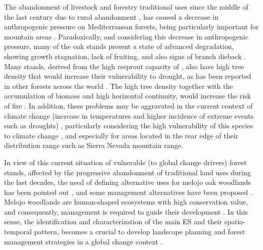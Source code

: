 The abandonment of livestock and forestry traditional uses since the middle of the last century due to rural abandonment \autocites{MacDonaldetal2000AgriculturalAbandonment}, has caused a decrease in anthropogenic pressure on Mediterranean forests, being particularly important for mountain areas \autocites{JimenezOlivenciaetal2015MedioSiglo,JimenezOlivenciaetal2015EvolucionUsos,Piasetal2014ColonizationAbandoned,ValbuenaCarabanaetal2010HistoricalRecent}. Paradoxically, and considering this decrease in anthropogenic pressure, many of the oak stands present a state of advanced degradation, showing growth stagnation, lack of fruiting, and also signs of branch dieback \autocites{Canellasetal2004GrowthResponse, Bravoetal2008SelviculturaMontes, ValbuenaCarabanaGil2014EfectosGestion, PiqueVericat2015EvolutionPerspectives, Piqueetal2018Spain}. Many stands, derived from the high resprout capacity of \Qp, also have high tree density that would increase their vulnerability to drought, as has been reported in other forests across the world \autocite{McDowelletal2020PervasiveShifts}. The high tree density together with the accumulation of biomass and high horizontal continuity, would increase the risk of fire \autocites{Bravoetal2008SelviculturaMontes,GarciaJimenez20099230Robledales}. In addition, these problems may be aggravated in the current context of climate change (increase in temperatures and higher incidence of extreme events such as droughts) \autocites{IPCC2013ClimateChange,Spinonietal2018WillDrought}, particularly considering the high vulnerability of this species to climate change \autocites{Benitoetal2011SimulatingPotential,GarciaValdesetal2013ChasingMoving,SanchezdeDiosetal2009PresentFuture,GeaIzquierdoetal2013GrowthProjections}, and especially for areas located in the rear edge of their distribution range such as Sierra Nevada mountain range.

In view of this current situation of vulnerable (to global change drivers) forest stands, affected by the progressive abandonment of traditional land uses during the last decades, the need of defining alternative uses for melojo oak woodlands has been pointed out \autocites{MesonMontoya1985VegetacionForestal,SanMigueletal2012BosquesMatorrales}, and some management alternatives have been proposed \autocite[\emph{e.g.} sylvopastoral uses, see][]{HerreraCalvo2016UsoPastoral}. Melojo woodlands are human-shaped ecosystems with high conservation value, and consequently, management is required to guide their development \autocite{Hobbsetal2006NovelEcosystems}. In this sense, the identification and characterization of the main ES and their spatio-temporal pattern, becomes a crucial to develop landscape planning and forest management strategies in a global change context \autocites{Piqueetal2018Spain}. 

